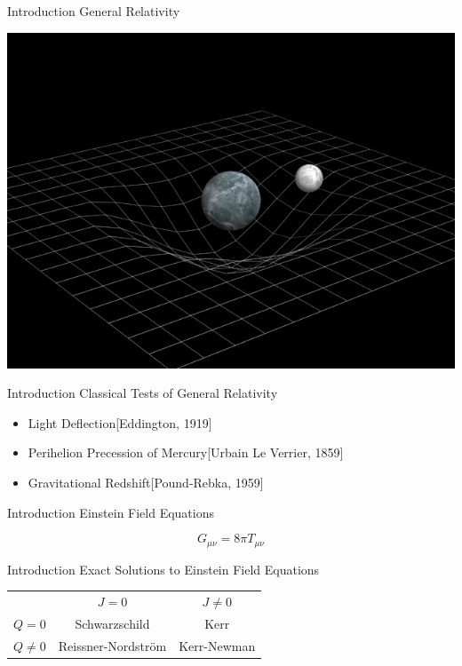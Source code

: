 \documentclass[xcolor=dvipsnames]{beamer}
\begin{document}
	\begin{frame}{Introduction}
		General Relativity
		\begin{center}
			\includegraphics[scale=0.4]{curvature.jpg}
		\end{center}
	\end{frame}
	\begin{frame}{Introduction}
		Classical Tests of General Relativity
		\begin{itemize}
			\item{Light Deflection[Eddington, 1919]}
			\item{Perihelion Precession of Mercury[Urbain Le Verrier, 1859]}
			\item{Gravitational Redshift[Pound-Rebka, 1959]}
		\end{itemize}
	\end{frame}
	\begin{frame}{Introduction}
		Einstein Field Equations
		\Huge
		\begin{center}
			\[
			G_{\mu\nu} = 8\pi T_{\mu\nu}
			\]
		\end{center}
	\end{frame}
	\begin{frame}{Introduction}
		Exact Solutions to Einstein Field Equations
		\begin{center}
			\Large
			\begin{tabular}{|c c c|}
				\hline
				\cellcolor[gray]{0.7}~ & \cellcolor[gray]{0.9}$J=0$ & $J \ne 0$ \\
				\rowcolor[gray]{0.9}$Q=0$ & \cellcolor[gray]{1.0}Schwarzschild & \cellcolor[gray]{0.7}Kerr \\
				\cellcolor[gray]{1.0}$Q\ne 0$ & \cellcolor[gray]{0.7}Reissner-Nordstr\"{o}m & \cellcolor[gray]{0.9}Kerr-Newman\\ \hline
			\end{tabular}
		\end{center}
	\end{frame}
\end{document}
